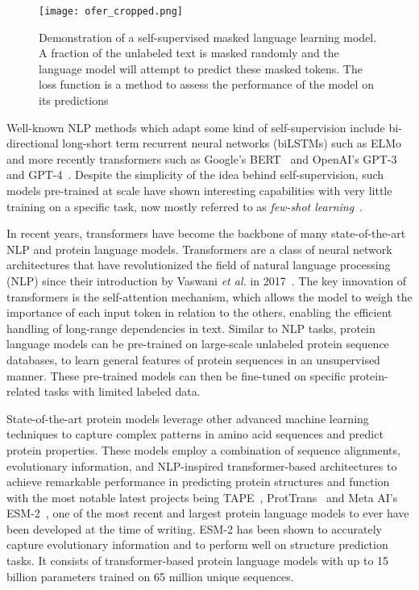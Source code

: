 \begin{figure}[!ht]
    \centering
    \texttt{[image: ofer\_cropped.png]}
    \caption{Demonstration of a self-supervised masked language learning model. A fraction of the unlabeled text is masked randomly and the language model will attempt to predict these masked tokens. The loss function is a method to assess the performance of the model on its predictions}
    \label{fig:ofer}
\end{figure}

Well-known NLP methods which adapt some kind of self-supervision include bi-directional long-short term recurrent neural networks (biLSTMs) such as ELMo~\cite{elmo} and more recently transformers such as Google's BERT~\cite{bert} and OpenAI's GPT-3~\cite{gpt3} and GPT-4~\cite{gpt4}. Despite the simplicity of the idea behind self-supervision, such models pre-trained at scale have shown interesting capabilities with very little training on a specific task, now mostly referred to as \textit{few-shot learning}~\cite{review}. 

In recent years, transformers have become the backbone of many state-of-the-art NLP and protein language models. Transformers are a class of neural network architectures that have revolutionized the field of natural language processing (NLP) since their introduction by Vaswani \textit{et al.} in 2017~\cite{transfor}. The key innovation of transformers is the self-attention mechanism, which allows the model to weigh the importance of each input token in relation to the others, enabling the efficient handling of long-range dependencies in text. Similar to NLP tasks, protein language models can be pre-trained on large-scale unlabeled protein sequence databases, to learn general features of protein sequences in an unsupervised manner. These pre-trained models can then be fine-tuned on specific protein-related tasks with limited labeled data.

State-of-the-art protein models leverage other advanced machine learning techniques to capture complex patterns in amino acid sequences and predict protein properties. These models employ a combination of sequence alignments, evolutionary information, and NLP-inspired transformer-based architectures to achieve remarkable performance in predicting protein structures and function with the most notable latest projects being TAPE~\cite{tape}, ProtTrans~\cite{prottrans} and Meta AI's ESM-2~\cite{esm2}, one of the most recent and largest protein language models to ever have been developed at the time of writing. ESM-2 has been shown to accurately capture evolutionary information and to perform well on structure prediction tasks. It consists of transformer-based protein language models with up to 15 billion parameters trained on 65 million unique sequences.

